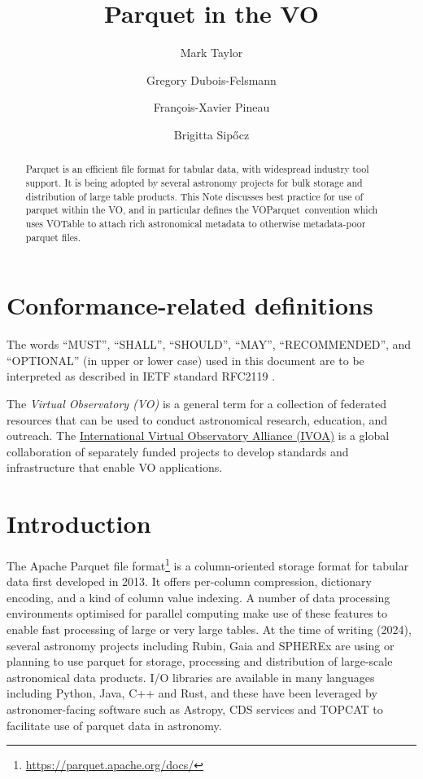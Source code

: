 \documentclass[11pt,a4paper]{ivoa}
\title{Parquet in the VO}
\author[https://wiki.ivoa.net/twiki/bin/view/IVOA/MarkTaylor]
       {Mark Taylor}
\author[https://wiki.ivoa.net/twiki/bin/view/IVOA/GregoryDuboisFelsmann]
       {Gregory Dubois-Felsmann}
\author[https://wiki.ivoa.net/twiki/bin/view/IVOA/FrancoisXavierPineau]
       {Fran\c{c}ois-Xavier Pineau}
\author{Brigitta Sip\H{o}cz}
\newcommand{\voparquet}{VOParquet}
\begin{document}
\begin{abstract}
Parquet is an efficient file format for tabular data,
with widespread industry tool support.
It is being adopted by several astronomy projects for bulk storage and
distribution of large table products.
This Note discusses best practice for use of parquet within the VO,
and in particular defines the \voparquet\ convention
which uses VOTable to attach rich astronomical metadata
to otherwise metadata-poor parquet files.
\end{abstract}

\section*{Conformance-related definitions}

The words ``MUST'', ``SHALL'', ``SHOULD'', ``MAY'', ``RECOMMENDED'', and
``OPTIONAL'' (in upper or lower case) used in this document are to be
interpreted as described in IETF standard RFC2119 \citep{std:RFC2119}.

The \emph{Virtual Observatory (VO)} is a
general term for a collection of federated resources that can be used
to conduct astronomical research, education, and outreach.
The \href{https://www.ivoa.net}{International
Virtual Observatory Alliance (IVOA)} is a global
collaboration of separately funded projects to develop standards and
infrastructure that enable VO applications.


\section{Introduction}
\label{sec:intro}

The Apache Parquet file
format\footnote{\url{https://parquet.apache.org/docs/}}
is a column-oriented storage format for tabular data
first developed in 2013.
It offers per-column compression, dictionary encoding, and
a kind of column value indexing.
A number of data processing environments optimised for parallel
computing make use of these features to enable fast processing
of large or very large tables.
At the time of writing (2024),
several astronomy projects including Rubin, Gaia and SPHEREx
are using or planning to use parquet for storage, processing
and distribution of large-scale astronomical data products.
I/O libraries are available in many languages including Python,
Java, C++ and Rust, and these have been leveraged by astronomer-facing
software such as Astropy, CDS services and TOPCAT to facilitate
use of parquet data in astronomy.
\end{document}
